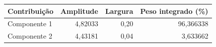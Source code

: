 \begin{tabular}{lrrr}
\toprule
Contribuição & Amplitude & Largura & Peso integrado (\%) \\
\midrule
Componente 1 & 4,82033 & 0,20 & 96,366338 \\
Componente 2 & 4,43181 & 0,04 & 3,633662 \\
\bottomrule
\end{tabular}
